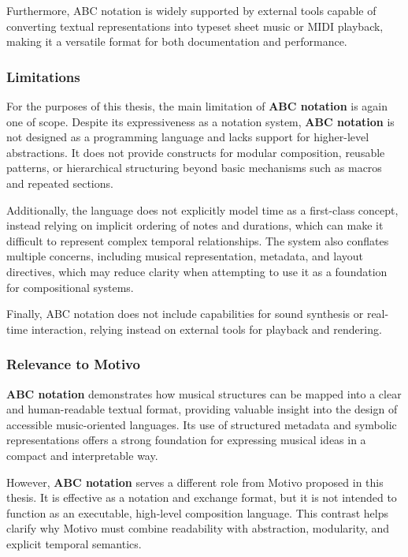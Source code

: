Furthermore, ABC notation is widely supported by external tools capable of converting textual representations into
typeset sheet music or MIDI playback, making it a versatile format for both documentation and performance.


\subsubsection{Limitations}

For the purposes of this thesis, the main limitation of \textbf{ABC notation} is again one of scope.
Despite its expressiveness as a notation system, \textbf{ABC notation} is not designed as a programming language and
lacks support for higher-level abstractions.
It does not provide constructs for modular composition, reusable patterns, or hierarchical structuring beyond basic
mechanisms such as macros and repeated sections.

Additionally, the language does not explicitly model time as a first-class concept, instead relying on implicit ordering
of notes and durations, which can make it difficult to represent complex temporal relationships.
The system also conflates multiple concerns, including musical representation, metadata, and layout directives, which
may reduce clarity when attempting to use it as a foundation for compositional systems.

Finally, ABC notation does not include capabilities for sound synthesis or real-time interaction, relying instead on
external tools for playback and rendering.


\subsubsection{Relevance to Motivo}

\textbf{ABC notation} demonstrates how musical structures can be mapped into a clear and human-readable textual format,
providing valuable insight into the design of accessible music-oriented languages.
Its use of structured metadata and symbolic representations offers a strong foundation for expressing musical ideas in a
compact and interpretable way.

However, \textbf{ABC notation} serves a different role from Motivo proposed in this thesis.
It is effective as a notation and exchange format, but it is not intended to function as an executable, high-level
composition language.
This contrast helps clarify why Motivo must combine readability with abstraction, modularity, and explicit
temporal semantics.

